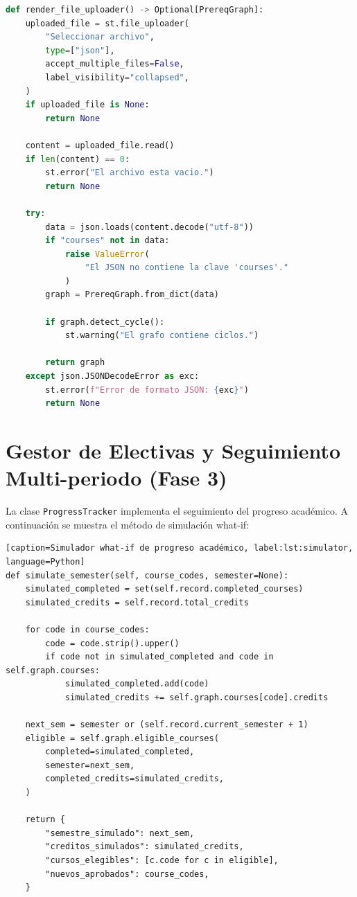 \documentclass[12pt]{report}
\begin{document}
\begin{lstlisting}[caption=Procesamiento de archivos JSON subidos, label=lst:drag-drop, language=Python]
def render_file_uploader() -> Optional[PrereqGraph]:
    uploaded_file = st.file_uploader(
        "Seleccionar archivo",
        type=["json"],
        accept_multiple_files=False,
        label_visibility="collapsed",
    )
    if uploaded_file is None:
        return None

    content = uploaded_file.read()
    if len(content) == 0:
        st.error("El archivo esta vacio.")
        return None

    try:
        data = json.loads(content.decode("utf-8"))
        if "courses" not in data:
            raise ValueError(
                "El JSON no contiene la clave 'courses'."
            )
        graph = PrereqGraph.from_dict(data)

        if graph.detect_cycle():
            st.warning("El grafo contiene ciclos.")

        return graph
    except json.JSONDecodeError as exc:
        st.error(f"Error de formato JSON: {exc}")
        return None
\end{lstlisting}

\section{Gestor de Electivas y Seguimiento Multi-periodo (Fase 3)}

La clase \texttt{ProgressTracker} implementa el seguimiento del progreso académico. A continuación se muestra el método de simulación what-if:

\begin{lstlisting}[caption=Simulador what-if de progreso académico, label:lst:simulator, language=Python]
def simulate_semester(self, course_codes, semester=None):
    simulated_completed = set(self.record.completed_courses)
    simulated_credits = self.record.total_credits

    for code in course_codes:
        code = code.strip().upper()
        if code not in simulated_completed and code in self.graph.courses:
            simulated_completed.add(code)
            simulated_credits += self.graph.courses[code].credits

    next_sem = semester or (self.record.current_semester + 1)
    eligible = self.graph.eligible_courses(
        completed=simulated_completed,
        semester=next_sem,
        completed_credits=simulated_credits,
    )

    return {
        "semestre_simulado": next_sem,
        "creditos_simulados": simulated_credits,
        "cursos_elegibles": [c.code for c in eligible],
        "nuevos_aprobados": course_codes,
    }
\end{lstlisting}
\end{document}

